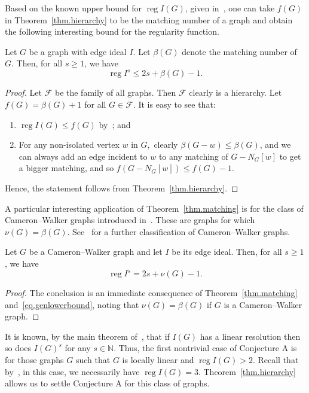 \documentclass[ALCO,ThmDefs,Unicode,epreuves]{cedram}
\DeclareMathOperator{\reg}{reg}
\newcommand{\NN}{{\mathbb N}}
\newcommand{\F}{\mathcal{F}}
\newcommand*{\reg}{\mathrm{reg}}
\begin{document}
Based on the known upper bound for $\reg I(G)$, given in~\cite{HVT2008}, one can take $f(G)$ in Theorem~\ref{thm.hierarchy} to be the matching number of a graph and obtain the following interesting bound for the regularity function.

\begin{theo} \label{thm.matching}
Let $G$ be a graph with edge ideal $I$. Let $\beta(G)$ denote the matching number of $G$. Then, for all $s \ge 1$, we have
\[
\reg I^s \le 2s+\beta(G)-1.
\]

\end{theo}

\begin{proof} Let $\F$ be the family of all graphs. Then $\F$ clearly is a hierarchy. Let $f(G) = \beta(G)+1$ for all $G \in \F$. It is easy to see that:
\begin{enumerate}
\item $\reg I(G) \le f(G)$ by~\cite[Theorem 6.7]{HVT2008}; and
\item For any non-isolated vertex $w$ in $G,$ clearly $\beta(G-w) \le \beta(G)$, and we can always add an edge incident to $w$ to any matching of $G - N_G[w]$ to get a bigger matching, and so $f(G-N_G[w]) \le f(G)-1.$
\end{enumerate}
Hence, the statement follows from Theorem~\ref{thm.hierarchy}.
\end{proof}

A particular interesting application of Theorem~\ref{thm.matching} is for the class of Cameron--Walker graphs introduced in~\cite{CW}. These are graphs for which $\nu(G) = \beta(G)$. See~\cite{HHKO} for a further classification of Cameron--Walker graphs.

\begin{coro} \label{cor.CW}
Let $G$ be a Cameron--Walker graph and let $I$ be its edge ideal. Then, for all $s \ge 1$, we have
\[
\reg I^s = 2s + \nu(G)-1.
\]

\end{coro}

\begin{proof} The conclusion is an immediate consequence of Theorem~\ref{thm.matching} and~\eqref{eq.genlowerbound}, noting that $\nu(G) = \beta(G)$ if $G$ is a Cameron--Walker graph.
\end{proof}

It is known, by the main theorem of~\cite{HHZ}, that if $I(G)$ has a linear resolution then so does $I(G)^s$ for any $s \in \NN$. Thus, the first nontrivial case of Conjecture $\text{A}$ is for those graphs $G$ such that $G$ is locally linear and $\reg I(G) > 2$. Recall that by~\cite[Proposition 4.9]{CHHKTT}, in this case, we necessarily have $\reg I(G) = 3$. Theorem~\ref{thm.hierarchy} allows us to settle Conjecture $\text{A}$ for this class of graphs.
\end{document}
